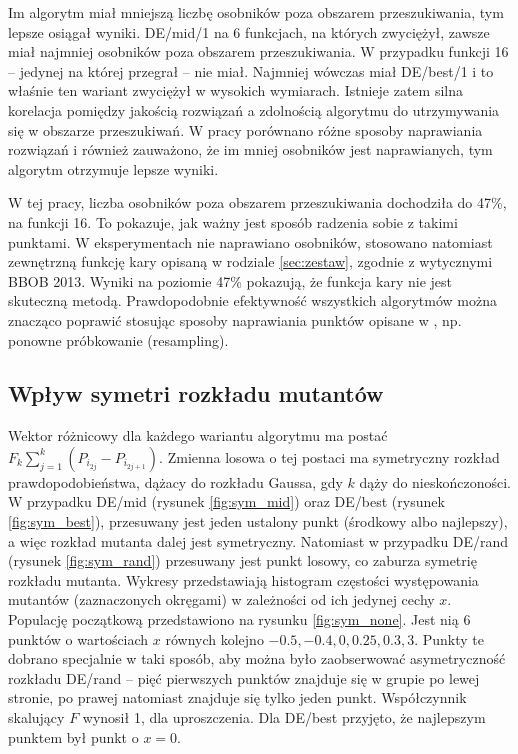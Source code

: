 \documentclass[a4paper,onecolumn,oneside,12pt,wide,floatssmall]{mwrep}
\theoremstyle{definition}
\theoremstyle{plain}%
\theoremstyle{remark}
\begin{document}
Im algorytm miał mniejszą liczbę osobników poza obszarem przeszukiwania, tym lepsze osiągał wyniki.
DE/mid/1 na 6 funkcjach, na których zwyciężył, zawsze miał najmniej osobników poza obszarem
przeszukiwania. W przypadku funkcji 16 -- jedynej na której przegrał -- nie miał. Najmniej
wówczas miał DE/best/1 i to właśnie ten wariant zwyciężył w wysokich wymiarach. Istnieje zatem silna korelacja
pomiędzy jakością rozwiązań a zdolnością algorytmu do utrzymywania się w obszarze przeszukiwań.
W pracy \cite{boundary} porównano różne sposoby naprawiania rozwiązań i również zauważono, że im mniej
osobników jest naprawianych, tym algorytm otrzymuje lepsze wyniki.

W tej pracy, liczba osobników poza obszarem przeszukiwania dochodziła do 47\%, na funkcji 16. To pokazuje,
jak ważny jest sposób radzenia sobie z takimi punktami. W eksperymentach nie 
naprawiano osobników, stosowano natomiast zewnętrzną funkcję kary opisaną w rodziale \ref{sec:zestaw},
zgodnie z wytycznymi BBOB 2013. Wyniki na poziomie 47\% pokazują, że funkcja kary nie jest 
skuteczną metodą. Prawdopodobnie efektywność wszystkich algorytmów można znacząco poprawić 
stosując sposoby naprawiania punktów opisane w \cite{boundary}, np. ponowne próbkowanie (resampling).

\subsection{Wpływ symetri rozkładu mutantów}

Wektor różnicowy dla każdego wariantu algorytmu ma postać
$ F_k\sum\limits_{j=1}^k (P_{i_{2j}} - P_{i_{2j+1}}) $. Zmienna losowa o tej postaci
ma symetryczny rozkład prawdopodobieństwa, dążacy do rozkładu Gaussa, gdy $k$ dąży do 
nieskończoności. W przypadku DE/mid (rysunek \ref{fig:sym_mid}) 
oraz DE/best (rysunek \ref{fig:sym_best}),
przesuwany jest jeden ustalony punkt (środkowy albo najlepszy), 
a więc rozkład mutanta dalej jest symetryczny.
Natomiast w przypadku DE/rand (rysunek \ref{fig:sym_rand}) 
przesuwany jest punkt losowy, co zaburza symetrię rozkładu mutanta.
Wykresy przedstawiają histogram częstości występowania
mutantów (zaznaczonych okręgami) w zależności od ich jedynej cechy $x$.
Populację początkową przedstawiono na rysunku \ref{fig:sym_none}.
Jest nią 6 punktów o wartościach $x$ równych kolejno $-0.5, -0.4, 0, 0.25, 0.3, 3$.
Punkty te dobrano specjalnie w taki sposób, aby można było zaobserwować asymetryczność
rozkładu DE/rand -- pięć pierwszych punktów znajduje się w grupie po lewej stronie, 
po prawej natomiast znajduje się tylko jeden punkt.
Współczynnik skalujący $F$ wynosił 1, dla uproszczenia.
Dla DE/best przyjęto, że najlepszym punktem był punkt o $x = 0$.
\end{document}
